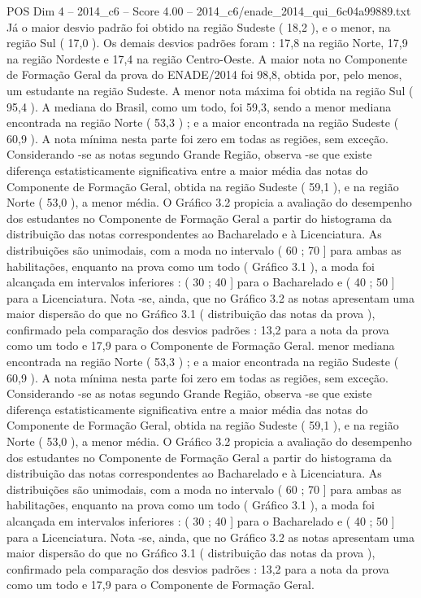 \begin{textsample}{POS Dim 4 – 2014\_c6 – Score 4.00 – 2014\_c6/enade\_2014\_qui\_6c04a99889.txt}
Já o maior desvio padrão foi obtido na região Sudeste ( 18,2 ), e o menor, na região Sul ( 17,0 ).
Os demais desvios padrões foram : 17,8 na região Norte, 17,9 na região Nordeste e 17,4 na região Centro-Oeste.
A maior nota no Componente de Formação Geral da prova do ENADE/2014 foi 98,8, obtida por, pelo menos, um estudante na região Sudeste.
A menor nota máxima foi obtida na região Sul ( 95,4 ).
A mediana do Brasil, como um todo, foi 59,3, sendo a menor mediana encontrada na região Norte ( 53,3 ) ; e a maior encontrada na região Sudeste ( 60,9 ).
A nota mínima nesta parte foi zero em todas as regiões, sem exceção.
Considerando -se as notas segundo Grande Região, observa -se que existe diferença estatisticamente significativa entre a maior média das notas do Componente de Formação Geral, obtida na região Sudeste ( 59,1 ), e na região Norte ( 53,0 ), a menor média.
O Gráfico 3.2 propicia a avaliação do desempenho dos estudantes no Componente de Formação Geral a partir do histograma da distribuição das notas correspondentes ao Bacharelado e à Licenciatura.
As distribuições são unimodais, com a moda no intervalo ( 60 ; 70 ] para ambas as habilitações, enquanto na prova como um todo ( Gráfico 3.1 ), a moda foi alcançada em intervalos inferiores : ( 30 ; 40 ] para o Bacharelado e ( 40 ; 50 ] para a Licenciatura.
Nota -se, ainda, que no Gráfico 3.2 as notas apresentam uma maior dispersão do que no Gráfico 3.1 ( distribuição das notas da prova ), confirmado pela comparação dos desvios padrões : 13,2 para a nota da prova como um todo e 17,9 para o Componente de Formação Geral. menor mediana encontrada na região Norte ( 53,3 ) ; e a maior encontrada na região Sudeste ( 60,9 ).
A nota mínima nesta parte foi zero em todas as regiões, sem exceção.
Considerando -se as notas segundo Grande Região, observa -se que existe diferença estatisticamente significativa entre a maior média das notas do Componente de Formação Geral, obtida na região Sudeste ( 59,1 ), e na região Norte ( 53,0 ), a menor média.
O Gráfico 3.2 propicia a avaliação do desempenho dos estudantes no Componente de Formação Geral a partir do histograma da distribuição das notas correspondentes ao Bacharelado e à Licenciatura.
As distribuições são unimodais, com a moda no intervalo ( 60 ; 70 ] para ambas as habilitações, enquanto na prova como um todo ( Gráfico 3.1 ), a moda foi alcançada em intervalos inferiores : ( 30 ; 40 ] para o Bacharelado e ( 40 ; 50 ] para a Licenciatura.
Nota -se, ainda, que no Gráfico 3.2 as notas apresentam uma maior dispersão do que no Gráfico 3.1 ( distribuição das notas da prova ), confirmado pela comparação dos desvios padrões : 13,2 para a nota da prova como um todo e 17,9 para o Componente de Formação Geral.

\end{textsample}
